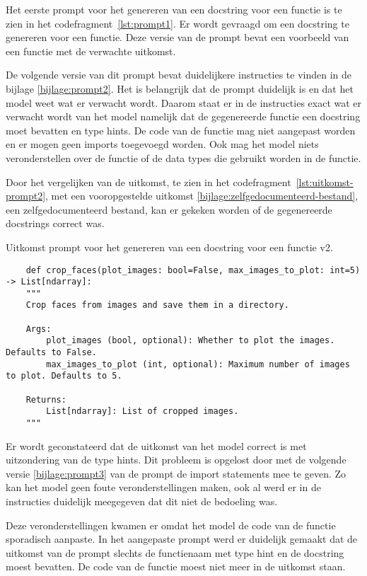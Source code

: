 Het eerste prompt voor het genereren van een docstring voor een functie is te zien in het codefragment~\ref{lst:prompt1}.
Er wordt gevraagd om een docstring te genereren voor een functie. Deze versie van de prompt bevat een voorbeeld van een functie met de verwachte uitkomst. 

De volgende versie van dit prompt bevat duidelijkere instructies te vinden in de bijlage \ref{bijlage:prompt2}.
Het is belangrijk dat de prompt duidelijk is en dat het model weet wat er verwacht wordt. 
Daarom staat er in de instructies exact wat er verwacht wordt van het model namelijk dat de gegenereerde functie een docstring moet bevatten en type hints.
De code van de functie mag niet aangepast worden en er mogen geen imports toegevoegd worden.
Ook mag het model niets veronderstellen over de functie of de data types die gebruikt worden in de functie.

Door het vergelijken van de uitkomst, te zien in het codefragment~\ref{lst:uitkomst-prompt2}, met een vooropgestelde uitkomst \ref{bijlage:zelfgedocumenteerd-bestand}, een zelfgedocumenteerd bestand, kan er gekeken worden of de gegenereerde docstrings correct was.
\begin{listing}
    \caption{Uitkomst prompt voor het genereren van een docstring voor een functie v2.}
    \label{lst:uitkomst-prompt2}
    \begin{verbatim}
    def crop_faces(plot_images: bool=False, max_images_to_plot: int=5) -> List[ndarray]:
    """
    Crop faces from images and save them in a directory.

    Args:
        plot_images (bool, optional): Whether to plot the images. Defaults to False.
        max_images_to_plot (int, optional): Maximum number of images to plot. Defaults to 5.

    Returns:
        List[ndarray]: List of cropped images.
    """
    \end{verbatim}
\end{listing}
Er wordt geconstateerd dat de uitkomst van het model correct is met uitzondering van de type hints. 
Dit probleem is opgelost door met de volgende versie \ref{bijlage:prompt3} van de prompt de import statements mee te geven.
Zo kan het model geen foute veronderstellingen maken, ook al werd er in de instructies duidelijk meegegeven dat dit niet de bedoeling was.

Deze veronderstellingen kwamen er omdat het model de code van de functie sporadisch aanpaste.
In het aangepaste prompt werd er duidelijk gemaakt dat de uitkomst van de prompt slechts de functienaam met type hint en de docstring moest bevatten.
De code van de functie moest niet meer in de uitkomst staan.

